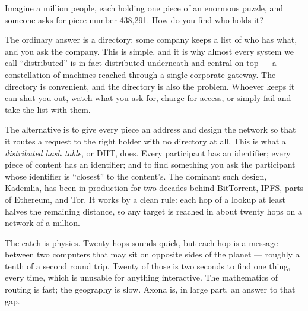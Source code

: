 \documentclass[nobib,justified]{tufte-handout}
\begin{document}
Imagine a million people, each holding one piece of an enormous puzzle, and
someone asks for piece number 438,291. How do you find who holds it?

The ordinary answer is a directory: some company keeps a list of who has what,
and you ask the company. This is simple, and it is why almost every system we
call ``distributed'' is in fact distributed underneath and central on top --- a
constellation of machines reached through a single corporate gateway. The
directory is convenient, and the directory is also the problem. Whoever keeps
it can shut you out, watch what you ask for, charge for access, or simply fail
and take the list with them.

The alternative is to give every piece an address and design the network so
that it routes a request to the right holder with no directory at all. This is
what a \emph{distributed hash table}, or DHT, does. Every participant has an
identifier; every piece of content has an identifier; and to find something you
ask the participant whose identifier is ``closest'' to the content's. The
dominant such design, Kademlia, has been in production for two decades behind
BitTorrent, IPFS, parts of Ethereum, and Tor. It works by a clean rule: each
hop of a lookup at least halves the remaining distance, so any target is
reached in about twenty hops on a network of a million.

The catch is physics. Twenty hops sounds quick, but each hop is a message
between two computers that may sit on opposite sides of the planet --- roughly
a tenth of a second round trip. Twenty of those is two seconds to find one
thing, every time, which is unusable for anything interactive. The mathematics
of routing is fast; the geography is slow. Axona is, in large part, an answer
to that gap.
\end{document}
